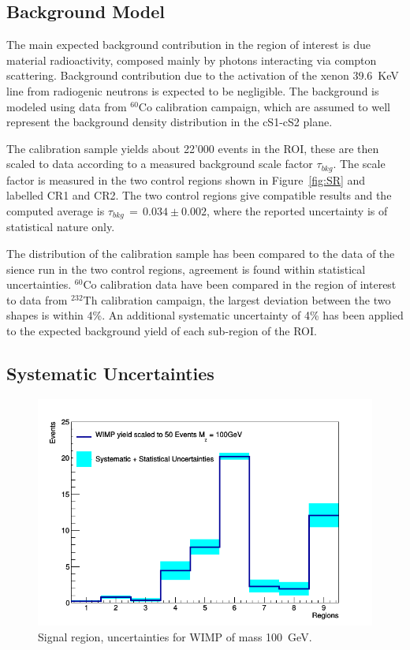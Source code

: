 \subsection {Background Model}

The main expected background contribution in the region of interest is due material radioactivity, composed mainly by photons  
interacting via compton scattering. Background contribution due to the activation of the xenon 39.6~KeV line from radiogenic neutrons is expected to be negligible.
The background is modeled using data from $^{60}$Co calibration campaign, which are assumed to well represent the background density distribution 
in the cS1-cS2 plane. 

The calibration sample yields  about 22'000 events in the ROI, these are then scaled to data according to a measured background scale factor $\tau_{bkg}$.
The scale factor is measured in the two control regions shown in Figure~\ref{fig:SR} and labelled CR1 and CR2. The two control 
regions give compatible results and the computed average is $\tau_{bkg} \, =  \, 0.034 \pm 0.002 $, where the reported uncertainty 
is of statistical nature only.

The distribution of the calibration sample has been compared to the data of the sience run in the two control regions,
agreement is found within statistical uncertainties. $^{60}$Co calibration data have been compared in the region of interest to  
data from $^{232}$Th calibration campaign, the largest deviation between the two shapes is within 4\%. An additional systematic
uncertainty of 4\% has been applied to the expected background yield of each sub-region of the ROI.




\subsection{Systematic Uncertainties}

\begin{figure}[t!]
  \includegraphics[width=\linewidth]{images/wimp_sys_unc.png}
  \caption{Signal region, uncertainties for WIMP of mass 100~GeV.}
  \label{fig:unc}
\end{figure}


